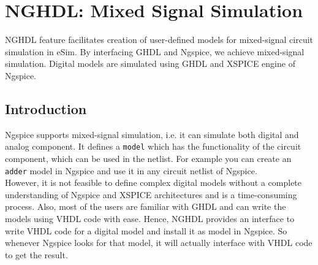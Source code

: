 \chapter{NGHDL: Mixed Signal Simulation}
\label{chap9}
\thispagestyle{empty}


NGHDL feature facilitates creation of user-defined models for mixed-signal circuit simulation in eSim. By interfacing GHDL and Ngspice, we achieve mixed-signal simulation. Digital models are simulated using GHDL and XSPICE engine of Ngspice. \\



\section{Introduction}

Ngspice supports mixed-signal simulation, i.e. it can simulate both digital and analog component. It defines a \texttt{model} which has the functionality of the circuit component, which can be used in the netlist.
For example you can create an \texttt{adder} model in Ngspice and use it in any circuit netlist of Ngspice. \\

However, it is not feasible to define complex digital models without a complete understanding of Ngspice and XSPICE architectures and is a time-consuming process. Also, most of the users are familiar with GHDL and can write the models using VHDL code with ease.
Hence, NGHDL provides an  interface to write VHDL code for a digital model and install it as model in Ngspice. So whenever Ngspice looks for that model, it will actually interface with VHDL code to get the result. \\

